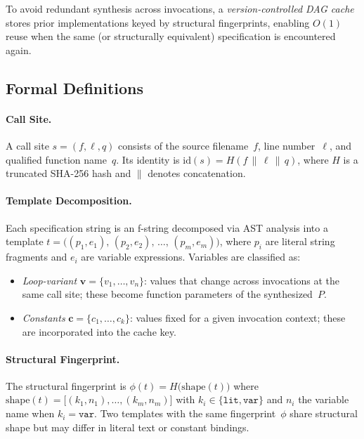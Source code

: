 To avoid redundant synthesis across invocations, a
\emph{version-controlled DAG cache} stores prior implementations keyed by
structural fingerprints, enabling $O(1)$ reuse when the same (or structurally
equivalent) specification is encountered again.


\subsection{Formal Definitions}
\label{sec:definitions}

\paragraph{Call Site.}
A call site $s = (f, \ell, q)$ consists of the source filename~$f$, line
number~$\ell$, and qualified function name~$q$.  Its identity is
$\mathrm{id}(s) = H(f \,\|\, \ell \,\|\, q)$, where $H$ is a truncated
SHA-256 hash and $\|$ denotes concatenation.

\paragraph{Template Decomposition.}
Each specification string is an f-string decomposed via AST analysis into a
template $t = \bigl((p_1, e_1),\, (p_2, e_2),\, \dots,\, (p_m, e_m)\bigr)$,
where $p_i$ are literal string fragments and $e_i$ are variable
expressions.  Variables are classified as:
\begin{itemize}
    \item \emph{Loop-variant} $\mathbf{v} = \{v_1, \dots, v_n\}$: values that
          change across invocations at the same call site; these become
          function parameters of the synthesized~$P$.
    \item \emph{Constants} $\mathbf{c} = \{c_1, \dots, c_k\}$: values fixed
          for a given invocation context; these are incorporated into the cache
          key.
\end{itemize}

\paragraph{Structural Fingerprint.}
The structural fingerprint is $\phi(t) = H\!\bigl(\mathrm{shape}(t)\bigr)$
where $\mathrm{shape}(t) = \bigl[(k_1, n_1), \dots, (k_m, n_m)\bigr]$ with
$k_i \in \{\texttt{lit}, \texttt{var}\}$ and $n_i$ the variable name when
$k_i = \texttt{var}$.  Two templates with the same fingerprint~$\phi$ share
structural shape but may differ in literal text or constant bindings.

